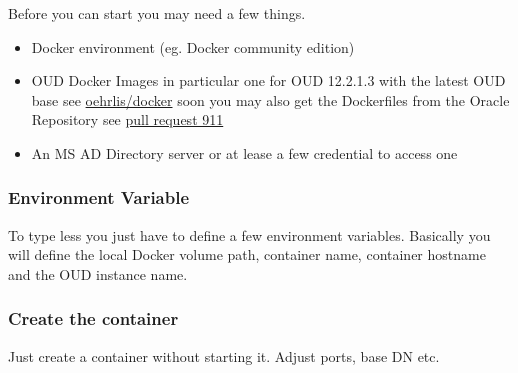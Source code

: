 \documentclass[a4paper,,tablecaptionabove]{scrartcl}
\newenvironment{Shaded}{}{}
\newcommand{\BuiltInTok}[1]{#1}
\newcommand{\StringTok}[1]{\textcolor[rgb]{0.25,0.44,0.63}{#1}}
\newcommand{\VariableTok}[1]{\textcolor[rgb]{0.10,0.09,0.49}{#1}}
\providecommand{\tightlist}{\setlength{\itemsep}{0pt}\setlength{\parskip}{0pt}}
\begin{document}
Before you can start you may need a few things.

\begin{itemize}
\tightlist
\item
  Docker environment (eg. Docker community edition)
\item
  OUD Docker Images in particular one for OUD 12.2.1.3 with the latest
  OUD base see \href{https://github.com/oehrlis/docker}{oehrlis/docker}
  soon you may also get the Dockerfiles from the Oracle Repository see
  \href{https://github.com/oracle/docker-images/pull/911}{pull request
  911}
\item
  An MS AD Directory server or at lease a few credential to access one
\end{itemize}

\hypertarget{environment-variable}{%
\subsubsection{Environment Variable}\label{environment-variable}}

To type less you just have to define a few environment variables.
Basically you will define the local Docker volume path, container name,
container hostname and the OUD instance name.

\begin{Shaded}
\end{Shaded}

\hypertarget{create-the-container}{%
\subsubsection{Create the container}\label{create-the-container}}

Just create a container without starting it. Adjust ports, base DN etc.
\end{document}
